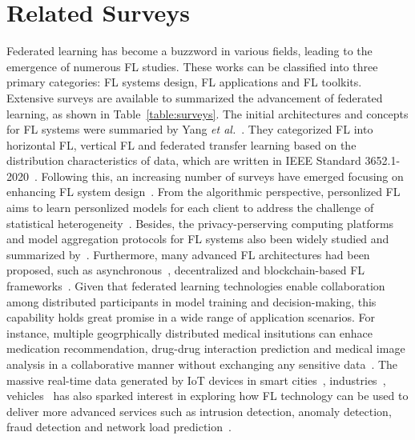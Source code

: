 \section{Related Surveys}
\label{sec:related}
Federated learning has become a buzzword in various fields, leading to the emergence of numerous FL studies.
These works can be classified into three primary categories: FL systems design, FL applications and FL toolkits. Extensive surveys are available to summarized the advancement of federated learning, as shown in Table~\ref{table:surveys}.
The initial architectures and concepts for FL systems were summaried by Yang \textit{et al.}~\cite{yang2019federated}. 
They categorized FL into horizontal FL, vertical FL and federated transfer learning based on the distribution characteristics of data, 
which are written in IEEE Standard 3652.1-2020~\cite{yang2021white, IEEEstd3652}. 
Following this, an increasing number of surveys have emerged focusing on enhancing FL system design~\cite{li2020federated,aledhari2020federated, kairouz2021advances, zhang2021survey, li2021survey}. 
From the algorithmic perspective, personlized FL~\cite{kulkarni2020survey, tan2022towards} aims to learn personlized models for each client to address the challenge of statistical heterogeneity~\cite{ma2022state}.
Besides, the privacy-perserving computing platforms and model aggregation protocols for FL systems also been widely studied and summarized by~\cite{liu2022privacy,el2022differential,yin2021comprehensive,lyu2020threats}.
Furthermore, many advanced FL architectures had been proposed, such as asynchronous~\cite{xu2023asynchronous}, decentralized and blockchain-based FL frameworks~\cite{nguyen2021federated, qu2022blockchain, zhu2022blockchain}.
Given that federated learning technologies enable collaboration among distributed participants in model training and decision-making, this capability holds great promise in a wide range of application scenarios.
For instance, multiple geogrphically distributed medical insitutions can enhace medication recommendation, drug-drug interaction prediction and medical image analysis in a collaborative manner without exchanging any sensitive data~\cite{xu2021federated, pfitzner2021federated, antunes2022federated, rieke2020future}. 
The massive real-time data generated by IoT devices in smart cities~\cite{zhang2022federated, ramu2022federated}, industries~\cite{boopalan2022fusion}, vehicles~\cite{du2020federated} has also sparked interest in exploring how FL technology can be used to deliver more advanced services such as intrusion detection, anomaly detection, fraud detection and network load prediction~\cite{agrawal2022federated, alazab2021federated, ghimire2022recent}.

